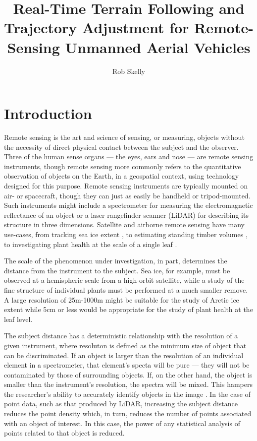 \documentclass[10pt]{report}
\author{Rob Skelly}
\title{Real-Time Terrain Following and Trajectory Adjustment for Remote-Sensing Unmanned Aerial Vehicles}
\begin{document}
\maketitle

\doublespace

\section{Introduction}

Remote sensing is the art and science of sensing, or measuring, objects without the necessity of direct physical contact between the subject and the observer. Three of the human sense organs --- the eyes, ears and nose --- are remote sensing instruments, though remote sensing more commonly refers to the quantitative observation of objects on the Earth, in a geospatial context, using technology designed for this purpose. Remote sensing instruments are typically mounted on air- or spacecraft, though they can just as easily be handheld or tripod-mounted. Such instruments might include a spectrometer for measuring the electromagnetic reflectance of an object or a laser rangefinder scanner (LiDAR) for describing its structure in three dimensions. Satellite and airborne remote sensing have many use-cases, from tracking sea ice extent \cite{Dierking2006,Shuchman2004}, to estimating standing timber volumes \cite{Allouis2011,Tonolli2011}, to investigating plant health at the scale of a single leaf \cite{Palou2013}.

The scale of the phenomenon under investigation, in part, determines the distance from the instrument to the subject. Sea ice, for example, must be observed at a hemispheric scale from a high-orbit satellite, while a study of the fine structure of individual plants must be performed at a much smaller remove. A large resolution of 25m-1000m \cite{Shuchman2004} might be suitable for the study of Arctic ice extent while 5cm or less \cite{Palou2013} would be appropriate for the study of plant health at the leaf level. 

The subject distance has a deterministic relationship with the resolution of a given instrument, where resoluton is defined as the minimum size of object that can be discriminated. If an object is larger than the resolution of an individual element in a spectrometer, that element's specta will be pure --- they will not be contaminated by those of surrounding objects. If, on the other hand, the object is smaller than the instrument's resolution, the spectra will be mixed. This hampers the researcher's ability to accurately identify objects in the image \cite{Lillesand1999}. In the case of point data, such as that produced by LiDAR, increasing the subject distance reduces the point density which, in turn, reduces the number of points associated with an object of interest. In this case, the power of any statistical analysis of points related to that object is reduced. 
\end{document}
